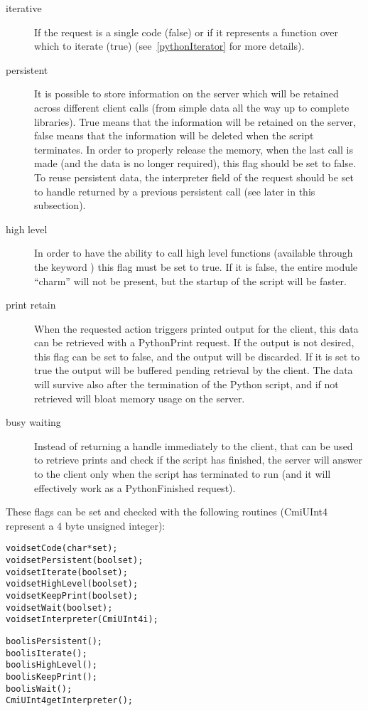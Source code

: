 \begin{description}

\item[iterative]
If the request is a single code (false) or if it represents a function over
which to iterate (true) (see~\ref{pythonIterator} for more details).

\item[persistent]
It is possible to store information on the server which will be
retained across different client calls (from simple data all the way
up to complete libraries). True means that the information will be
retained on the server, false means that the information will be
deleted when the script terminates. In order to properly release the
memory, when the last call is made (and the data is no longer
required), this flag should be set to false. To reuse persistent data,
the interpreter field of the request should be set to handle returned by a previous persistent call (see later in this subsection).

\item[high level]
In order to have the ability to call high level \charmpp{} functions (available
through the keyword ) this flag must be set to true. If it is false,
the entire module ``charm'' will not be present, but the startup of the script
will be faster.

\item[print retain]
When the requested action triggers printed output for the client, this data can be
retrieved with a PythonPrint request. If the output is not desired, this flag
can be set to false, and the output will be discarded. If it is set to true the
output will be buffered pending retrieval by the client. The data will
survive also after the termination of the Python script, and if not retrieved
will bloat memory usage on the server.

\item[busy waiting]
Instead of returning a handle immediately to the client, that can be used to
retrieve prints and check if the script has finished, the server will answer to
the client only when the script has terminated to run (and it will effectively
work as a PythonFinished request).

\end{description}

These flags can be set and checked with the following routines (CmiUInt4 represent a 4
byte unsigned integer):

\begin{alltt}
void setCode(char *set);
void setPersistent(bool set);
void setIterate(bool set);
void setHighLevel(bool set);
void setKeepPrint(bool set);
void setWait(bool set);
void setInterpreter(CmiUInt4 i);

bool isPersistent();
bool isIterate();
bool isHighLevel();
bool isKeepPrint();
bool isWait();
CmiUInt4 getInterpreter();
\end{alltt}

